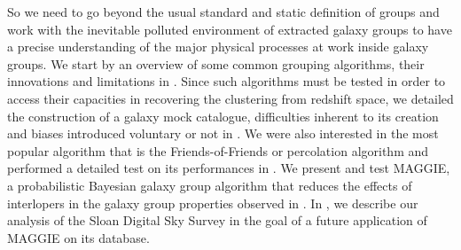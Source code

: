 So we need to go beyond the usual standard and static definition of groups and
work with the inevitable polluted environment of extracted galaxy groups to
have a precise understanding of the major physical processes at work inside
galaxy groups. We start by an overview of some common grouping algorithms,
their innovations and limitations in .
Since such algorithms must be tested in order to access their capacities in
recovering the clustering from redshift space, we detailed the construction of
a galaxy mock catalogue, difficulties inherent to its creation and biases
introduced voluntary or not in . We were also interested
in the most popular algorithm that is the Friends-of-Friends or percolation
algorithm and performed a detailed test on its performances in
. We present and test MAGGIE, a
probabilistic Bayesian galaxy group algorithm that reduces the effects of
interlopers in the galaxy group properties observed in .
In , we describe our analysis of the Sloan Digital Sky
Survey in the goal of a future application of MAGGIE on its database.

